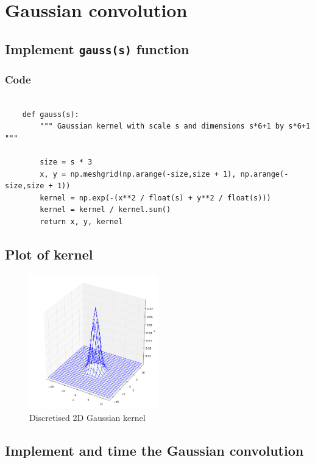 \documentclass[abstract=true]{scrartcl}
\begin{document}
\section{Gaussian convolution}

    \subsection{Implement \texttt{gauss(s)} function}

        \subsubsection{Code}

            \begin{verbatim}
        
    def gauss(s):
        """ Gaussian kernel with scale s and dimensions s*6+1 by s*6+1  """

        size = s * 3
        x, y = np.meshgrid(np.arange(-size,size + 1), np.arange(-size,size + 1))
        kernel = np.exp(-(x**2 / float(s) + y**2 / float(s)))
        kernel = kernel / kernel.sum()
        return x, y, kernel

            \end{verbatim}

    \subsection{Plot of kernel}

        \begin{figure}
          \centering
          \includegraphics[width=0.5\textwidth]{../images/2_kernel3d}
          \caption{Discretised 2D Gaussian kernel}
        \end{figure}

    \subsection{Implement and time the Gaussian convolution}
\end{document}

